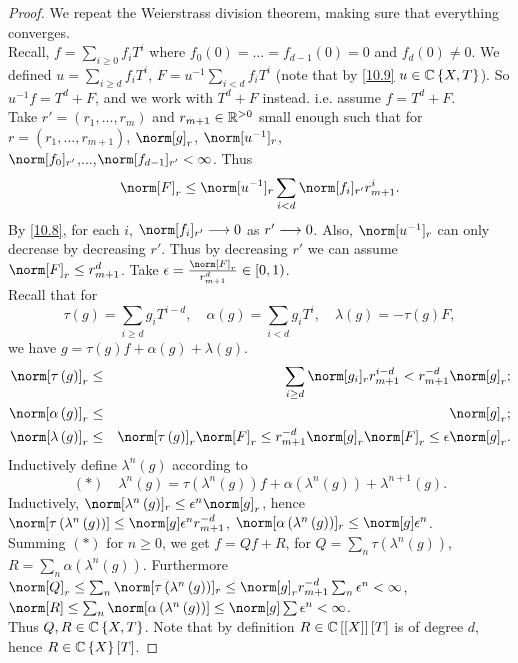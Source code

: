 \begin{proof}
We repeat the Weierstrass division theorem, making sure that everything
converges.\\
Recall, $f=\sum_{i\geq0}f_{i}T^{i}$ where $f_{0}\left(0\right)=...=f_{d-1}\left(0\right)=0$
and $f_{d}\left(0\right)\neq0$. We defined $u=\sum_{i\geq d}f_{i}T^{i}$,
$F=u^{-1}\sum_{i<d}f_{i}T^{i}$ (note that by \ref{10.9} $u\in\mathbb{C}\left\{ X,T\right\} $).
So $u^{-1}f=T^{d}+F$, and we work with $T^{d}+F$ instead. i.e. assume
$f=T^{d}+F$.\\
Take $r'=\left(r_{1},...,r_{m}\right)$ and $r_{m+1}\in\mathbb{R}^{>0}$ small
enough such that for $r=\left(r_{1},...,r_{m+1}\right)$, $\norm[g]_{r}$,
$\norm[u^{-1}]_{r}$, \\
$\norm[f_{0}]_{r'}$,...,$\norm[f_{d-1}]_{r'}<\infty$. Thus 
\[
\norm[F]_{r}\leq\norm[u^{-1}]_{r}\sum_{i<d}\norm[f_{i}]_{r'}r_{m+1}^{i}.
\]
By \ref{10.8}, for each $i$, $\norm[f_{i}]_{r'}\lto0$ as $r'\longrightarrow0$.
Also, $\norm[u^{-1}]_{r}$ can only decrease by decreasing $r'$.
Thus by decreasing $r'$ we can assume $\norm[F]_{r}\leq r_{m+1}^{d}$.
Take $\epsilon=\frac{\norm[F]_{r}}{r_{m+1}^{d}}\in\left[0,1\right)$.
\\
Recall that for 
\[
\tau\left(g\right)=\sum_{i\geq d}g_{i}T^{i-d},\quad\alpha\left(g\right)=\sum_{i<d}g_{i}T^{i},\quad\lambda\left(g\right)=-\tau\left(g\right)F,
\]
we have $g=\tau\left(g\right)f+\alpha\left(g\right)+\lambda\left(g\right)$.
\begin{eqnarray*}
\norm[\tau\left(g\right)]_{r} & \leq & \sum_{i\geq d}\norm[g_{i}]_{r}r_{m+1}^{i-d}<r_{m+1}^{-d}\norm[g]_{r};\\
\norm[\alpha\left(g\right)]_{r} & \leq & \norm[g]_{r};\\
\norm[\lambda\left(g\right)]_{r} & \leq & \norm[\tau\left(g\right)]_{r}\norm[F]_{r}\leq r_{m+1}^{-d}\norm[g]_{r}\norm[F]_{r}\leq\epsilon\norm[g]_{r}.
\end{eqnarray*}
Inductively define $\lambda^{n}\left(g\right)$ according to 
\[
\left(\ast\right)\quad\lambda^{n}\left(g\right)=\tau\left(\lambda^{n}\left(g\right)\right)f+\alpha\left(\lambda^{n}\left(g\right)\right)+\lambda^{n+1}\left(g\right).
\]
Inductively, $\norm[\lambda^{n}\left(g\right)]_{r}\leq\epsilon^{n}\norm[g]_{r}$,
hence $\norm[\tau\left(\lambda^{n}\left(g\right)\right)]\leq\norm[g]\epsilon^{n}r_{m+1}^{-d}$,
$\norm[\alpha\left(\lambda^{n}\left(g\right)\right)]_{r}\leq\norm[g]\epsilon^{n}$.\\
Summing $\left(\ast\right)$ for $n\geq0$, we get $f=Qf+R$, for
$Q=\sum_{n}\tau\left(\lambda^{n}\left(g\right)\right)$, $R=\sum_{n}\alpha\left(\lambda^{n}\left(g\right)\right)$.
Furthermore $\norm[Q]_{r}\leq\sum_{n}\norm[\tau\left(\lambda^{n}\left(g\right)\right)]_{r}\leq\norm[g]_{r}r_{m+1}^{-d}\sum_{n}\epsilon^{n}<\infty$,
$\norm[R]\leq\sum_{n}\norm[\alpha\left(\lambda^{n}\left(g\right)\right)]\leq\norm[g]\sum\epsilon^{n}<\infty$.
\\
Thus $Q,R\in\mathbb{C}\left\{ X,T\right\} $. Note that by definition $R\in\mathbb{C}\left[\left[X\right]\right]\left[T\right]$
is of degree $d$, hence $R\in\mathbb{C}\left\{ X\right\} \left[T\right]$.\end{proof}
